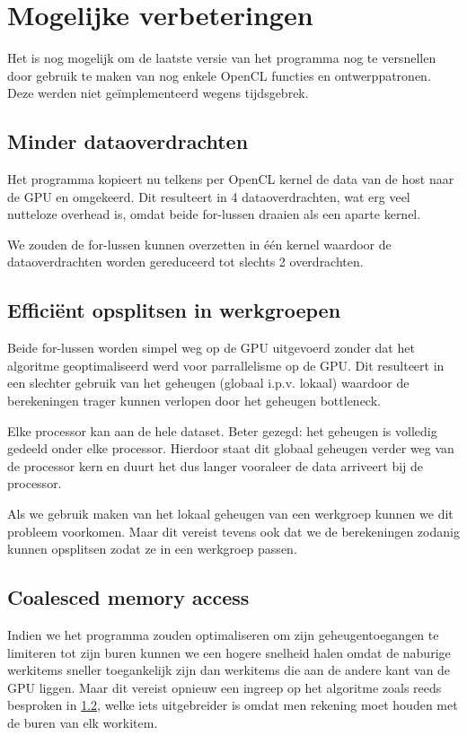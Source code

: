 \documentclass{article}
\begin{document}
\section{Mogelijke verbeteringen}
\label{hfd:verbeteringen}
Het is nog mogelijk om de laatste versie van het programma nog te versnellen door
gebruik te maken van nog enkele OpenCL functies en ontwerppatronen. Deze werden
niet ge\"{i}mplementeerd wegens tijdsgebrek.

\subsection{Minder dataoverdrachten}
\label{hfd:dataoverdrachten}
Het programma kopieert nu telkens per OpenCL kernel de data van de host naar de GPU en
omgekeerd. Dit resulteert in 4 dataoverdrachten, wat erg veel nutteloze
overhead is, omdat beide for-lussen draaien als een aparte kernel.

We zouden de for-lussen kunnen overzetten in \'{e}\'{e}n kernel waardoor de dataoverdrachten
worden gereduceerd tot slechts 2 overdrachten.

\subsection{Effici\"{e}nt opsplitsen in werkgroepen}
\label{hfd:werkgroepen}
Beide for-lussen worden simpel weg op de GPU uitgevoerd zonder dat het algoritme
geoptimaliseerd werd voor parrallelisme op de GPU. Dit resulteert in een slechter
gebruik van het geheugen (globaal i.p.v. lokaal) waardoor de berekeningen trager
kunnen verlopen door het geheugen bottleneck.

Elke processor kan aan de hele dataset. Beter gezegd: het geheugen is volledig
gedeeld onder elke processor. Hierdoor staat dit globaal geheugen verder weg
van de processor kern en duurt het dus langer vooraleer de data arriveert bij
de processor.

Als we gebruik maken van het lokaal geheugen van een werkgroep kunnen we dit probleem
voorkomen. Maar dit vereist tevens ook dat we de berekeningen zodanig kunnen opsplitsen
zodat ze in een werkgroep passen.

\subsection{Coalesced memory access}
Indien we het programma zouden optimaliseren om zijn geheugentoegangen te limiteren
tot zijn buren kunnen we een hogere snelheid halen omdat de naburige werkitems
sneller toegankelijk zijn dan werkitems die aan de andere kant van de GPU liggen.
Maar dit vereist opnieuw een ingreep op het algoritme zoals reeds besproken in
\ref{hfd:werkgroepen}, welke iets uitgebreider is omdat men rekening moet houden
met de buren van elk workitem.
\end{document}

